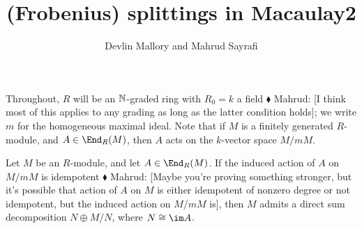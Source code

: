 \documentclass{article}
\title{(Frobenius) splittings in Macaulay2}
\author{Devlin Mallory and Mahrud Sayrafi}
\numberwithin{equation}{section}
\theoremstyle{theorem}
\numberwithin{thm}{section}
\theoremstyle{definition}
\newcommand{\mahrud}[1]{{\color{ForestGreen} \sf $\blacklozenge$ Mahrud: [#1]}}
\begin{document}
\maketitle

Throughout, $R$ will be an $\mathbb N$-graded ring with $R_0=k$ a field\mahrud{I think most of this applies to any grading as long as the latter condition holds}; we write $m$ for the homogeneous maximal ideal. Note that if $M$ is a finitely generated $R$-module, and $A\in \End_R(M)$, then $A$ acts on the $k$-vector space $M/mM$.

\begin{lem}
  Let $M$ be an $R$-module, and let $A\in\End_R(M)$. If the induced action of $A$ on $M/mM$ is idempotent\mahrud{Maybe you're proving something stronger, but it's possible that action of $A$ on $M$ is either idempotent of nonzero degree or not idempotent, but the induced action on $M/mM$ is}, then $M$ admits a direct sum decomposition $N\oplus M/N$, where $N\cong \im A$.
\end{lem}
\end{document}
